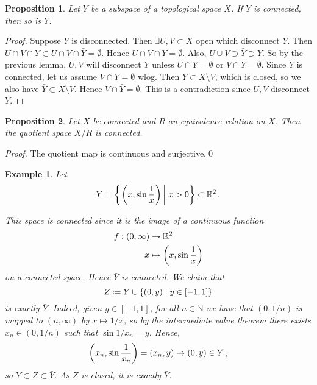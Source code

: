 \documentclass{article}
\theoremstyle{plain}\theoremheaderfont{\normalfont\itshape}\theorembodyfont{\rmfamily}\theoremseparator{.}\newtheorem*{rem}{Remark}\newtheorem*{ex}{Example}\newtheorem*{proof}{Proof}\newtheorem*{altp}{Alternative proof}
\theoremstyle{plain}\theoremheaderfont{\normalfont\bfseries}\theorembodyfont{\rmfamily}\theoremseparator{.}\newtheorem{thm}{Theorem}[section]\newtheorem{lem}[thm]{Lemma}\newtheorem{prop}[thm]{Proposition}\newtheorem*{cor}{Corollary}\newtheorem{defn}[thm]{Definition}\newtheorem{clm}[thm]{Claim}\newtheorem{clminproof}{Claim}
\theoremstyle{break}\theoremheaderfont{\normalfont\itshape}\theorembodyfont{\rmfamily}\theoremseparator{.\medskip}\newtheorem*{proofskip}{Proof}\newtheorem*{exs}{Examples}\newtheorem*{rems}{Remarks}
\theoremstyle{break}\theoremheaderfont{\normalfont\bfseries}\theorembodyfont{\rmfamily}\theoremseparator{.\medskip}\newtheorem{lemskip}[thm]{Lemma}\newtheorem{defnskip}[thm]{Definition}\newtheorem{propskip}[thm]{Proposition}\newtheorem{thmskip}[thm]{Theorem}
\newcommand{\qed}{\hfill\ensuremath{\Box}}
\begin{document}
    \begin{prop}
        Let \(Y\) be a subspace of a topological space \(X\). If \(Y\) is connected, then so is \(\bar{Y}\).
    \end{prop}
    \begin{proof}
        Suppose \(\bar{Y}\) is disconnected. Then \(\exists U,V\subset X\) open which disconnect \(\bar{Y}\). Then \(U\cap V\cap Y\subset U\cap V\cap\bar{Y}=\emptyset\). Hence \(U\cap V\cap Y=\emptyset\). Also, \(U\cup V\supset\bar{Y}\supset Y\). So by the previous lemma, \(U,V\) will disconnect \(Y\) unless \(U\cap Y=\emptyset\) or \(V\cap Y=\emptyset\). Since \(Y\) is connected, let us assume \(V\cap Y=\emptyset\) wlog. Then \(Y\subset X\setminus V\), which is closed, so we also have \(\bar{Y}\subset X\setminus V\). Hence \(V\cap\bar{Y}=\emptyset\). This is a contradiction since \(U,V\) disconnect \(\bar{Y}\).
    \end{proof}

    \begin{prop}
        Let \(X\) be connected and \(R\) an equivalence relation on \(X\). Then the quotient space \(X/R\) is connected.
    \end{prop}
    \begin{proof}
        The quotient map is continuous and surjective.\qed
    \end{proof}

    \begin{ex}
        Let
        \[Y=\qty{\left.\qty(x,\sin\frac{1}{x})\,\right|\,x>0}\subset\mathbb{R}^2\,.\]
        \begin{center}
        \end{center}
        This space is connected since it is the image of a continuous function
        \begin{align*}
            f:(0,\infty)&\to\mathbb{R}^2\\
            x&\mapsto\qty(x,\sin\frac{1}{x})
        \end{align*}
        on a connected space. Hence \(\bar{Y}\) is connected. We claim that
        \[Z\coloneqq Y\cup\qty{(0,y)\mid y\in[-1,1]}\]
        is exactly \(\bar{Y}\). Indeed, given \(y\in[-1,1]\), for all \(n\in\mathbb{N}\) we have that \((0,1/n)\) is mapped to \((n,\infty)\) by \(x\mapsto 1/x\), so by the intermediate value theorem there exists \(x_n\in(0,1/n)\) such that \(\sin 1/x_n=y\). Hence,
        \[\qty(x_n,\sin\frac{1}{x_n})=(x_n,y)\to(0,y)\in\bar{Y}\,,\]
        so \(Y\subset Z\subset\bar{Y}\). As \(Z\) is closed, it is exactly \(\bar{Y}\).
    \end{ex}
\end{document}
